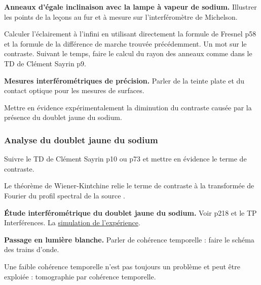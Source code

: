 \begin{experience}
\textbf{Anneaux d'égale inclinaison avec la lampe à vapeur de sodium.}
Illustrer les points de la leçons au fur et à mesure sur l'interféromètre de Michelson.
\end{experience}
Calculer l'éclairement à l'infini en utilisant directement la formule de Fresnel \cite{Olivier2000} p58 et la formule de la différence de marche trouvée précédemment.
Un mot sur le contraste.
Suivant le temps, faire le calcul du rayon des anneaux comme dans le TD de Clément Sayrin p9.

\begin{slide}
\textbf{Mesures interférométriques de précision.}
Parler de la teinte plate et du contact optique pour les mesures de surfaces.
\end{slide}

\begin{transition}
Mettre en évidence expérimentalement la diminution du contraste causée par la présence du doublet jaune du sodium.
\end{transition}

\subsubsection{Analyse du doublet jaune du sodium}

Suivre le TD de Clément Sayrin p10 ou \cite{Olivier2000} p73 et mettre en évidence le terme de contraste.

\begin{remarque}
Le théorème de Wiener-Kintchine relie le terme de contraste à la transformée de Fourier du profil spectral de la source \cite{Perez2017}.
\end{remarque}

\begin{experience}
\textbf{Étude interférométrique du doublet jaune du sodium.}
Voir \cite{Fruchart2016} p218 et le TP Interférences.
La \href{https://femto-physique.fr/simulations/interference-egale-inclinaison.php}{simulation de l'expérience}.
\end{experience}

\begin{experience}
\textbf{Passage en lumière blanche.}
Parler de cohérence temporelle : faire le schéma des trains d'onde.
\end{experience}

\begin{remarque}
Une faible cohérence temporelle n'est pas toujours un problème et peut être exploiée : tomographie par cohérence temporelle.
\end{remarque}

